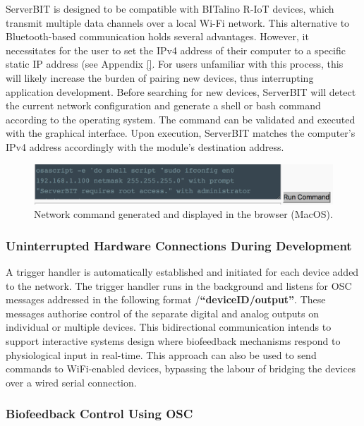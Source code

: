 ServerBIT is designed to be compatible with BITalino R-IoT devices, which transmit multiple data channels over a local Wi-Fi network. This alternative to Bluetooth-based communication holds several advantages. However, it necessitates for the user to set the IPv4 address of their computer to a specific static IP address (see Appendix \ref{}. For users unfamiliar with this process, this will likely increase the burden of pairing new devices, thus interrupting application development. Before searching for new devices, ServerBIT will detect the current network configuration and generate a shell or bash command according to the operating system. The command can be validated and executed with the graphical interface. Upon execution, ServerBIT matches the computer's IPv4 address accordingly with the module's destination address.

\begin{figure}[htbp]
    \centering
    \includegraphics[width=\textwidth]{Chapters/Figures/technical/ServerBIT/ipv4_cmd_osx.png}
    \caption{Network command generated and displayed in the browser (MacOS).}
    \label{fig:cmd_osx}
\end{figure}

\subsubsection*{Uninterrupted Hardware Connections During Development}

A trigger handler is automatically established and initiated for each device added to the network. The trigger handler runs in the background and listens for OSC messages addressed in the following format /\textbf{``deviceID/output''}. These messages authorise control of the separate digital and analog outputs on individual or multiple devices. This bidirectional communication intends to support interactive systems design where biofeedback mechanisms respond to physiological input in real-time. This approach can also be used to send commands to WiFi-enabled devices, bypassing the labour of bridging the devices over a wired serial connection.

\subsubsection*{Biofeedback Control Using OSC} \label{Biofeedback}


